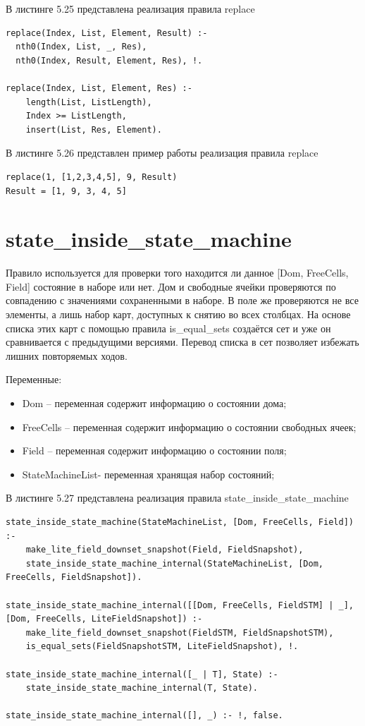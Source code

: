 \documentclass[12pt]{report}
\begin{document}
В листинге 5.25 представлена реализация правила replace

\begin{lstlisting}[label=some-code, caption=реализация правила replace]
replace(Index, List, Element, Result) :-
  nth0(Index, List, _, Res),
  nth0(Index, Result, Element, Res), !.

replace(Index, List, Element, Res) :-
	length(List, ListLength),
	Index >= ListLength,
	insert(List, Res, Element).
\end{lstlisting}
В листинге 5.26 представлен пример работы реализация правила replace

\begin{lstlisting}[label=some-code, caption=реализация правила replace]
replace(1, [1,2,3,4,5], 9, Result)
Result = [1, 9, 3, 4, 5]
\end{lstlisting}

\section{state\_inside\_state\_machine}
Правило используется для проверки того находится ли данное [Dom, FreeCells, Field] состояние в наборе или нет. Дом и свободные ячейки проверяются по совпадению с значениями сохраненными в наборе. В поле же проверяются не все элементы, а лишь набор карт, доступных к снятию во всех столбцах. На основе списка этих карт с помощью правила is\_equal\_sets создаётся сет и уже он сравнивается с предыдущими версиями. Перевод списка в сет позволяет избежать лишних повторяемых ходов.

Переменные:
\begin{itemize}
\item Dom – переменная содержит информацию о состоянии дома;
\item FreeCells – переменная содержит информацию о состоянии свободных ячеек;
\item Field – переменная содержит информацию о состоянии поля;
\item StateMachineList- переменная хранящая набор состояний;
\end{itemize}

В листинге 5.27 представлена реализация правила state\_inside\_state\_machine

\begin{lstlisting}[label=some-code, caption=реализация правила state\_inside\_state\_machine]
state_inside_state_machine(StateMachineList, [Dom, FreeCells, Field]) :-
	make_lite_field_downset_snapshot(Field, FieldSnapshot),
	state_inside_state_machine_internal(StateMachineList, [Dom, FreeCells, FieldSnapshot]).

state_inside_state_machine_internal([[Dom, FreeCells, FieldSTM] | _], [Dom, FreeCells, LiteFieldSnapshot]) :-
	make_lite_field_downset_snapshot(FieldSTM, FieldSnapshotSTM),
	is_equal_sets(FieldSnapshotSTM, LiteFieldSnapshot), !.

state_inside_state_machine_internal([_ | T], State) :-
	state_inside_state_machine_internal(T, State).

state_inside_state_machine_internal([], _) :- !, false.
\end{lstlisting}
\end{document}
